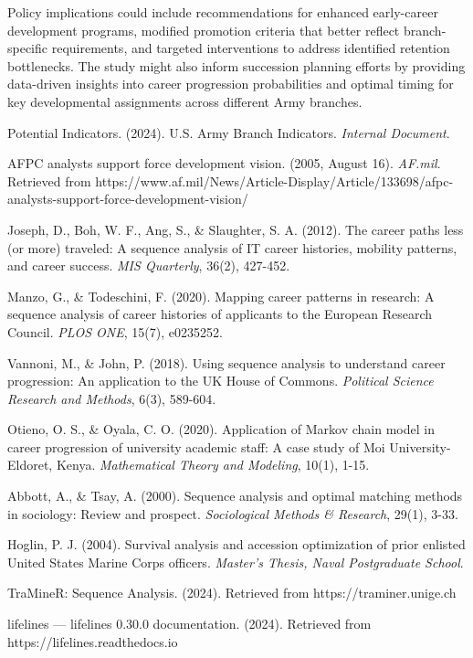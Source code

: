\documentclass[main.tex]{subfiles}
\begin{document}
Policy implications could include recommendations for enhanced early-career development programs, modified promotion criteria that better reflect branch-specific requirements, and targeted interventions to address identified retention bottlenecks. The study might also inform succession planning efforts by providing data-driven insights into career progression probabilities and optimal timing for key developmental assignments across different Army branches.

\begin{thebibliography}{99}

Potential Indicators. (2024). U.S. Army Branch Indicators. \textit{Internal Document}.

AFPC analysts support force development vision. (2005, August 16). \textit{AF.mil}. Retrieved from https://www.af.mil/News/Article-Display/Article/133698/afpc-analysts-support-force-development-vision/

Joseph, D., Boh, W. F., Ang, S., \& Slaughter, S. A. (2012). The career paths less (or more) traveled: A sequence analysis of IT career histories, mobility patterns, and career success. \textit{MIS Quarterly}, 36(2), 427-452.

Manzo, G., \& Todeschini, F. (2020). Mapping career patterns in research: A sequence analysis of career histories of applicants to the European Research Council. \textit{PLOS ONE}, 15(7), e0235252.

Vannoni, M., \& John, P. (2018). Using sequence analysis to understand career progression: An application to the UK House of Commons. \textit{Political Science Research and Methods}, 6(3), 589-604.

Otieno, O. S., \& Oyala, C. O. (2020). Application of Markov chain model in career progression of university academic staff: A case study of Moi University-Eldoret, Kenya. \textit{Mathematical Theory and Modeling}, 10(1), 1-15.

Abbott, A., \& Tsay, A. (2000). Sequence analysis and optimal matching methods in sociology: Review and prospect. \textit{Sociological Methods \& Research}, 29(1), 3-33.

Hoglin, P. J. (2004). Survival analysis and accession optimization of prior enlisted United States Marine Corps officers. \textit{Master's Thesis, Naval Postgraduate School}.

TraMineR: Sequence Analysis. (2024). Retrieved from https://traminer.unige.ch

lifelines — lifelines 0.30.0 documentation. (2024). Retrieved from https://lifelines.readthedocs.io

\end{thebibliography}
\end{document}
